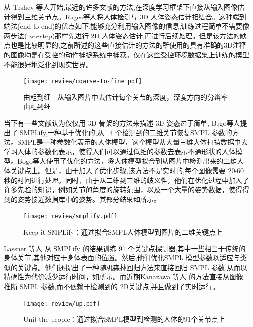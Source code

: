 \begin{refsection}
从 Toshev \cite{toshev2014deep}等人开始,最近的许多文献的方法,在深度学习框架下直接从输入图像估计得到三维关节点\cite{pavlakos2017coarse}\cite{tekin2017learning}\cite{tome2017lifting}\cite{zhou2017weaklysupervised}。Rogez\cite{rogez2016mocap}等人将人体检测与 3D 人体姿态估计相结合。这种端到端法(end-to-end)的优点如下:能够充分利用输入图像的信息,训练过程简单不需要像两步法(two-step)那样先进行 2D 人体姿态估计,再进行后续处理。但是该方法的缺点也是比较明显的,之前所述的这些直接估计的方法的所使用的具有准确的3D注释的图像均是在受控的动作捕捉系统中捕获。仅在这些受控环境数据集上训练的模型不能很好地泛化到现实世界。

\begin{figure}[ht]
    \centering
    \texttt{[image: review/coarse-to-fine.pdf]}
    \caption{由粗到细\autocite{pavlakos2017coarse}：从输入图片中去估计每个关节的深度，深度方向的分辨率由粗到细}\label{fig:c2f}
\end{figure}

当下有一些文献认为仅仅用 3D 骨架的方法来描述 3D 姿态过于简单, Bogo等人\cite{bogo2016keep}提出了 SMPLify,一种基于优化的,从 14 个检测到的二维关节恢复SMPL 参数的方法。SMPL\autocite{loper2015smpl}是一种参数化表示的人体模型，这个模型从大量三维人体扫描数据中去学习人体的参数化表示，使得人们可以通过低维的参数去表示不通形状的人体模型。Bogo等人\cite{bogo2016keep}使用了优化的方法，将人体模型拟合到从图片中检测出来的二维人体关键点上。但是，由于加入了优化步骤,该方法不是实时的,每个图像需要 20-60 秒的时间进行处理。同时，由于从二维到三维的歧义性，他们在优化过程中加入了许多先验的知识，例如关节的角度的旋转范围，以及一个大量的姿势数据，使得得到的姿势接近数据库中的姿势。其部分结果如所示。 

\begin{figure}[ht]
    \centering
    \texttt{[image: review/smplify.pdf]}
    \caption{Keep it SMPLify\autocite{bogo2016keep}：通过拟合SMPL人体模型到图片的二维关键点上}\label{fig:smpl1}
\end{figure}

Lassner \cite{lassner2017unite} 等人 从 SMPLify 的结果训练 91 个关键点探测器,其中一些相当于传统的身体关节,其他对应于身体表面的位置。然后,他们优化SMPL 模型参数以适应与\cite{bogo2016keep}类似的关键点。他们还提出了一种随机森林回归方法来直接回归 SMPL 参数,从而以精确性为代价减少运行时间，如所示。而近期Kanazawa 等人\cite{kanazawa2018end} 的方法直接从图像推断 SMPL 参数,而不依赖于检测到的 2D关键点,并且做到了实时运行。

\begin{figure}[ht]
    \centering
    \texttt{[image: review/up.pdf]}
    \caption{Unit the people\autocite{lassner2017unite}：通过拟合SMPL模型到检测的人体的91个关节点上}\label{fig:up}
\end{figure}


\newpage
\printbibliography
\end{refsection}
